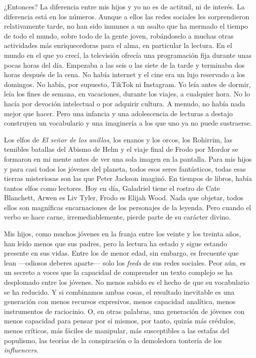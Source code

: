 ¿Entonces? La diferencia entre mis hijos y yo no es de actitud, ni de interés. La diferencia está en los números. Aunque a ellos las redes sociales les sorprendieron relativamente tarde, no han sido inmunes a un asalto que ha mermado el tiempo de todo el mundo, sobre todo de la gente joven, robándoselo a muchas otras actividades más enriquecedoras para el alma, en particular la lectura. En el mundo en el que yo crecí, la televisión ofrecía una programación fija durante unas pocas horas del día. Empezaba a las seis o las siete de la tarde y terminaba dos horas después de la cena. No había internet y el cine era un lujo reservado a los domingos. No había, por supuesto, TikTok ni Instagram. Yo leía antes de dormir, leía los fines de semana, en vacaciones, durante los viajes, a cualquier hora. No lo hacía por devoción intelectual o por adquirir cultura. A menudo, no había nada mejor que hacer. Pero una infancia y una adolescencia de lecturas a destajo construyen un vocabulario y una imaginería a los que uno ya no puede sustraerse.

Los elfos de \emph{El señor de los anillos}, los enanos y los orcos, los Rohirrim, las temibles batallas del Abismo de Helm y el viaje final de Frodo por Mordor se formaron en mi mente antes de ver una sola imagen en la pantalla. Para mis hijos y para casi todos los jóvenes del planeta, todos esos seres fantásticos, todas esas tierras misteriosas son las que Peter Jackson imaginó. En tiempos de libros, había tantos elfos como lectores. Hoy en día, Galadriel tiene el rostro de Cate Blanchett, Arwen es Liv Tyler, Frodo es Elijah Wood. Nada que objetar, todos ellos son magníficas encarnaciones de los personajes de la leyenda. Pero cuando el verbo se hace carne, irremediablemente, pierde parte de su carácter divino.

Mis hijos, como muchos jóvenes en la franja entre los veinte y los treinta años, han leído menos que sus padres, pero la lectura ha estado y sigue estando presente en sus vidas. Entre los de menor edad, sin embargo, es frecuente que lean ---odiosos deberes aparte--- solo los \emph{feeds} de sus redes sociales. Peor aún, es un secreto a voces que la capacidad de comprender un texto complejo se ha desplomado entre los jóvenes. No menos sabido es el hecho de que su vocabulario se ha reducido. Y si combinamos ambas cosas, el resultado inevitable es una generación con menos recursos expresivos, menos capacidad analítica, menos instrumentos de raciocinio. O, en otras palabras, una generación de jóvenes con menos capacidad para pensar por sí mismos, por tanto, quizás más crédulos, menos críticos, más fáciles de manipular, más susceptibles a las estafas del populismo, las teorías de la conspiración o la demoledora tontería de los \emph{influencers}.

